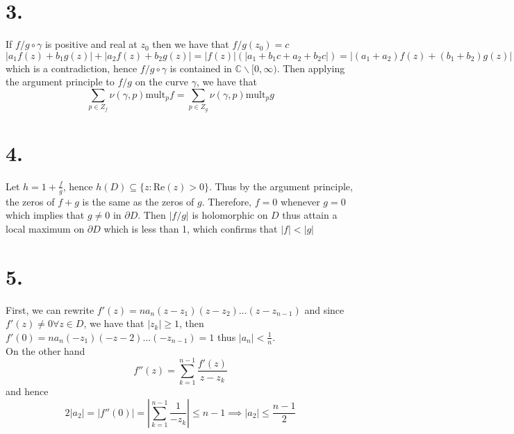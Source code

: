 \documentclass[11pt]{article}
\begin{document}
\section*{3.}
If $f/g \circ \gamma$ is positive and real at $z_0$ then we have that $f/g(z_0) = c$
\[
    |a_1f(z) + b_1g(z)| + |a_2f(z) + b_2g(z)| = |f(z)|(|a_1 + b_1c + a_2 + b_2c|) = |(a_1 + a_2)f(z) + (b_1 + b_2)g(z)|
\]
which is a contradiction, hence $f/g \circ \gamma$ is contained in $\mathbb{C} \backslash [0, \infty)$.
Then applying the argument principle to $f/g$ on the curve $\gamma$, we have that 
\[
    \sum_{p \in Z_f} \nu(\gamma, p) \text{mult}_p f = \sum_{p \in Z_g} \nu(\gamma, p) \text{mult}_p g
\]
\newpage
\section*{4.}
Let $h = 1 + \frac{f}{g}$, hence $h(D) \subseteq \{z: \text{Re}(z)> 0\}$. Thus by the argument principle, the zeros of $f+g$ is the same as the zeros of $g$. 
Therefore, $f = 0$ whenever $g=0$ which implies that $g \ne 0$ in $\partial D$. Then $|f/g|$ is holomorphic on $D$ thus attain a local maximum on $\partial D$ which is less than 1, which confirms that $|f|<|g|$
\newpage
\section*{5.}
First, we can rewrite $f'(z) = n a_n(z-z_1)(z-z_2)\hdots(z-z_{n-1})$ and since $f'(z) \ne 0 \forall z \in D$, we have that $|z_k|\ge1$, 
then $f'(0) = n a_n(-z_1)(-z-2)\hdots (-z_{n-1}) = 1$ thus $|a_n| < \frac{1}{n}$. \\
On the other hand 
\[
    f''(z) = \sum_{k=1}^{n-1} \frac{f'(z)}{z-z_k}
\]
and hence 
\[
    2|a_2| = |f''(0)| = \left|\sum_{k=1}^{n-1} \frac{1}{-z_k} \right| \le n-1 \implies |a_2| \le \frac{n-1}{2}
\]
\end{document}
